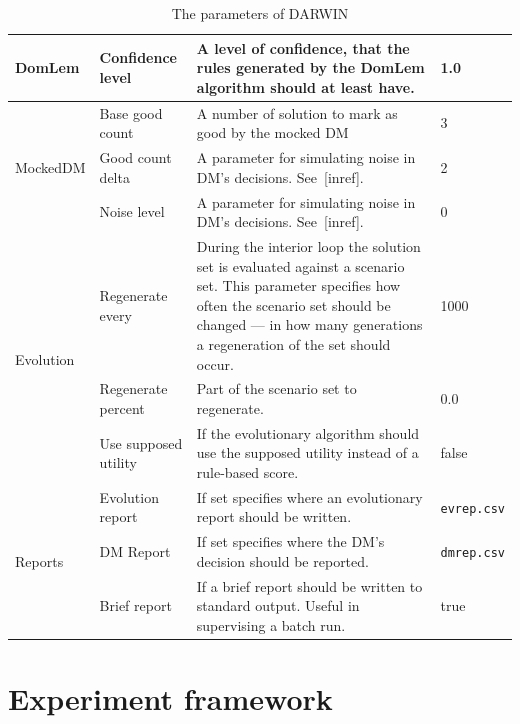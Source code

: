\begin{table}
\begin{tabular}{l l p{7cm} l}
    \hline
    DomLem & Confidence level & A level of confidence, that the rules generated by the
    DomLem algorithm should at least have. & 1.0 \\
    \hline
    \multirow{3}{*}{MockedDM} & Base good count & A number of solution to mark
    as good by the mocked DM& 3 \\
    & Good count delta & A parameter for simulating noise in DM's decisions. See~[inref]. & 2 \\
    & Noise level & A parameter for simulating noise in DM's decisions. See~[inref]. & 0 \\
    \hline
    \multirow{3}{*}{Evolution} & Regenerate every & During the interior loop
    the solution set is evaluated against a scenario set. This parameter
    specifies how often the scenario set should be changed --- in how many
    generations a regeneration of the set should occur. & 1000 \\
    & Regenerate percent & Part of the scenario set to regenerate. & 0.0 \\
    & Use supposed utility & If the evolutionary algorithm should use the
    supposed utility instead of a rule-based score. & false \\
  \hline
  \multirow{3}{*}{Reports} & Evolution report & If set specifies where an
  evolutionary report should be written.  & \texttt{evrep.csv} \\
  & DM Report & If set specifies where the DM's decision should be reported. & \texttt{dmrep.csv} \\
  &  Brief report & If a brief report should be written to standard
  output. Useful in supervising a batch run. & true \\
  \hline
  \end{tabular}
  \caption{The parameters of DARWIN}
  \label{t:params}
\end{table}



\section{Experiment framework}
